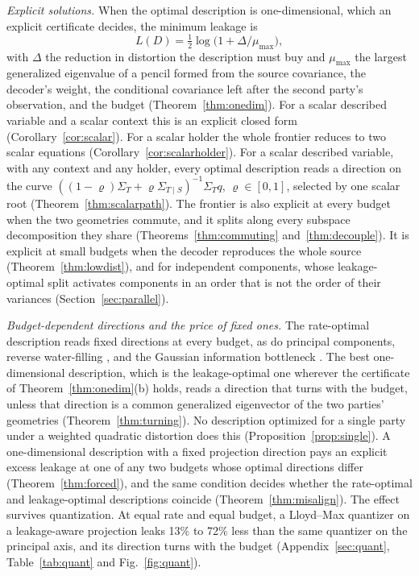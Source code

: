 \documentclass[11pt,onecolumn]{IEEEtran}
\newcommand{\Kc}{\Sigma_{T\mid S}}
\begin{document}
\emph{Explicit solutions.} When the optimal description is
one-dimensional, which an explicit certificate decides, the minimum
leakage is
\[
L(D)=\tfrac12\log\bigl(1+\Delta/\mu_{\max}\bigr),
\]
with $\Delta$ the reduction in distortion the description must buy and
$\mu_{\max}$ the largest generalized eigenvalue of a pencil formed from
the source covariance, the decoder's weight, the conditional covariance
left after the second party's observation, and the budget
(Theorem~\ref{thm:onedim}). For a scalar described variable and a scalar
context this is an explicit closed form (Corollary~\ref{cor:scalar}). For
a scalar holder the whole frontier reduces to two scalar equations
(Corollary~\ref{cor:scalarholder}). For a scalar described variable, with
any context and any holder, every optimal description reads a direction
on the curve $((1-\varrho)\Sigma_T+\varrho\Kc)^{-1}\Sigma_Tq$,
$\varrho\in[0,1]$, selected by one scalar root
(Theorem~\ref{thm:scalarpath}). The frontier is also explicit at every
budget when the two geometries commute, and it splits along every
subspace decomposition they share (Theorems~\ref{thm:commuting}
and~\ref{thm:decouple}). It is explicit at small budgets when the decoder
reproduces the whole source (Theorem~\ref{thm:lowdist}), and for
independent components, whose leakage-optimal split activates components
in an order that is not the order of their variances
(Section~\ref{sec:parallel}).

\emph{Budget-dependent directions and the price of fixed ones.} The
rate-optimal description reads fixed directions at every budget, as do
principal components, reverse water-filling \cite{berger1971}, and the
Gaussian information bottleneck \cite{chechik2005}. The best
one-dimensional description, which is the leakage-optimal one wherever
the certificate of Theorem~\ref{thm:onedim}(b) holds, reads a direction
that turns with the budget, unless that direction is a common generalized
eigenvector of the two parties' geometries (Theorem~\ref{thm:turning}).
No description optimized for a single party under a weighted quadratic
distortion does this (Proposition~\ref{prop:single}). A one-dimensional
description with a fixed projection direction pays an explicit excess
leakage at one of any two budgets whose optimal directions differ
(Theorem~\ref{thm:forced}), and the same condition decides whether the
rate-optimal and leakage-optimal descriptions coincide
(Theorem~\ref{thm:misalign}). The effect survives quantization. At equal
rate and equal budget, a Lloyd--Max quantizer on a leakage-aware
projection leaks 13\% to 72\% less than the same quantizer on the
principal axis, and its direction turns with the budget
(Appendix~\ref{sec:quant}, Table~\ref{tab:quant} and
Fig.~\ref{fig:quant}).
\end{document}
